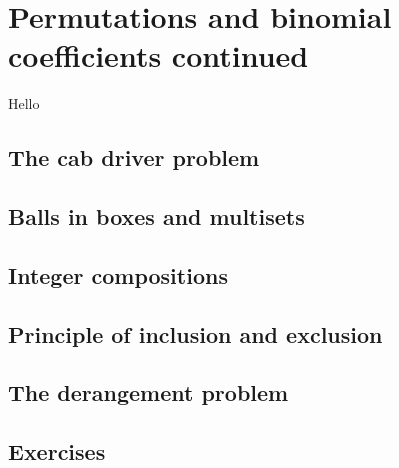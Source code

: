 \section{Permutations and binomial coefficients continued}\label{permutationsBinomialCoefficient} 

Hello

\subsection{The cab driver problem}

\subsection{Balls in boxes and multisets}

\subsection{Integer compositions}

\subsection{Principle of inclusion and exclusion}

\subsection{The derangement problem}

\subsection{Exercises}